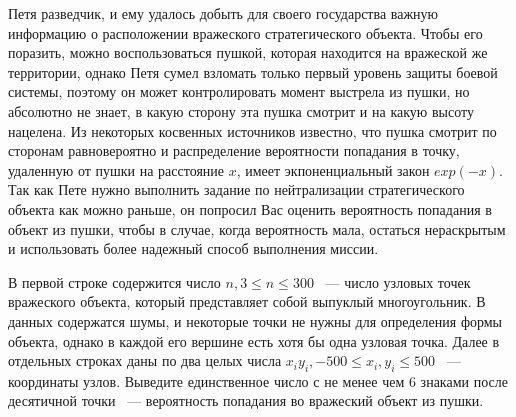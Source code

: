 Петя разведчик, и ему удалось добыть для своего государства
важную информацию о расположении вражеского стратегического
объекта. Чтобы его поразить, можно воспользоваться
пушкой, которая находится на вражеской же территории, однако
Петя сумел взломать только первый уровень защиты боевой
системы, поэтому он может контролировать момент выстрела
из пушки, но абсолютно не знает, в какую сторону эта пушка
смотрит и на какую высоту нацелена. Из некоторых косвенных
источников известно, что пушка смотрит по сторонам равновероятно
и распределение вероятности попадания в точку, удаленную
от пушки на расстояние $x$, имеет экпоненциальный закон
$exp(-x)$. Так как Пете нужно выполнить задание по нейтрализации
стратегического объекта как можно раньше, он попросил Вас
оценить вероятность попадания в объект из пушки, чтобы
в случае, когда вероятность мала, остаться нераскрытым
и использовать более надежный способ выполнения миссии.

\InputFile
В первой строке содержится число $n, 3 \le n \le 300$ ~--- число узловых точек
вражеского объекта, который представляет собой выпуклый многоугольник.
В данных содержатся шумы, и некоторые точки не нужны для определения формы
объекта, однако в каждой его вершине есть хотя бы одна узловая точка.
Далее в отдельных строках даны по два целых числа
$x_i y_i, -500 \le x_i, y_i \le 500$ ~--- координаты узлов.
\OutputFile
Выведите единственное число с не менее чем 6 знаками после десятичной точки
~--- вероятность попадания во вражеский объект из пушки.

